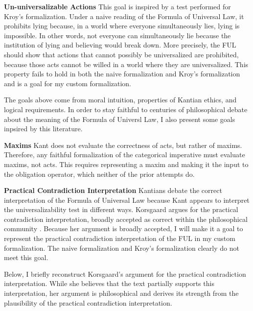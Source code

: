 \begin{isabellebody}
\begin{isamarkuptext}
\medskip 

\textbf{Un-universalizable Actions} This goal is inspired by a test performed for Kroy's formalization. Under 
a naive reading of the Formula of Universal Law, it prohibits lying because, in a world 
where everyone simultaneously lies, lying is impossible. In other words, not everyone can simultaneously
lie because the institution of lying and believing would break down. More precisely, the FUL should 
show that actions that cannot possibly be universalized are prohibited, because those acts cannot be willed in 
a world where they are universalized. This property fails to hold in both the naive formalization 
and Kroy's formalization and is a goal for my custom formalization.%
\end{isamarkuptext}\isamarkuptrue%
%
\isadelimdocument
%
\endisadelimdocument
%
\isatagdocument
%
\isamarkuptrue%
%
\endisatagdocument
{\isafolddocument}%
%
\isadelimdocument
%
\endisadelimdocument
%
\begin{isamarkuptext}%
The goals above come from moral intuition, properties of Kantian ethics, and logical requirements. 
In order to stay faithful to centuries of philosophical debate about the meaning of the Formula of 
Universl Law, I also present some goals inpsired by this literature.

\textbf{Maxims} Kant does not evaluate the correctness of acts, but rather of maxims. Therefore, any 
faithful formalization of the categorical imperative must evaluate maxims, not acts. This requires 
representing a maxim and making it the input to the obligation operator, which neither of the prior attempts do.

\medskip%
\end{isamarkuptext}\isamarkuptrue%
%
\begin{isamarkuptext}%
\textbf{Practical Contradiction Interpretation} Kantians debate the correct interpretation of the Formula of Universal Law because Kant appears to 
interpret the universalizability test in different ways. Korsgaard argues for the practical contradiction 
interpretation, broadly accepted as correct within the philosophical community \cite[177]{ebelsduggan}.
Because her argument is broadly accepted, I will make it a goal to represent the practical contradiction
interpretation of the FUL in my custom formalization. The naive formalization and Kroy's formalization
clearly do not meet this goal.

Below, I briefly reconstruct Korsgaard's argument for the practical contradiction interpretation. While 
she believes that the text partially supports this interpretation, her argument is philosophical and 
derives its strength from the plausibility of the practical contradiction interpretation.


\end{isamarkuptext}
\end{isabellebody}
